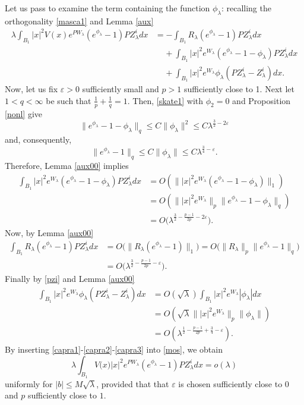 \documentclass[reqno,11pt]{amsart}
\theoremstyle{definition}
\numberwithin{equation}{section}
\newcommand{\la}{\lambda}
\newcommand{\into}{\int_{B_1}}
\newcommand{\e}{\varepsilon}
\renewcommand{\(}{\left(}
\renewcommand{\)}{\right)}
\renewcommand{\[}{\left[}
\renewcommand{\]}{\right]}
\newcommand{\beq}{\begin{equation}}
\newcommand{\eeq}{\end{equation}}
\begin{document}
{Let us pass to examine  the term containing the function $\phi_\la$: recalling the orthogonality \eqref{masca1} and Lemma \ref{aux}
\beq\label{mos}\begin{aligned} \la\int_{B_1}|x|^2 V(x) e^{P W_\la}(e^{\phi_\la}-1)PZ^i_{\la} dx&= -\into R_\la
(e^{\phi_\la}-1)PZ^i_{\la} dx
\\ &\;\;\;\;+ \int_{B_1}  |x|^2e^{W_\la}(e^{\phi_\la}-1-\phi_\la)PZ^i_{\la}  dx\\ &\;\;\;\;+ \into  |x|^2e^{W_\la}\phi_\la(PZ^i_{\la}-Z_\la^i)  dx.
\end{aligned}\eeq
Now, let us fix $\e>0$ sufficiently small and $p>1$ sufficiently close to 1.  
Next let  $1<q<\infty$ be such that  $\frac1p+\frac1q=1$. Then, 
\eqref{skate1} with $\phi_2=0$ and Proposition \ref{nonl} give
$$\|e^{\phi_\la}-1-\phi_\la\|_q\leq  C\|\phi_\la\|^2\leq C \la^{\frac32-2 \e} 
$$
and, consequently, 
\beq\label{tmtsur}\|e^{\phi_\la}-1\|_q\leq C\|\phi_\la\|\leq C\la^{\frac34-\e}
.\eeq
Therefore,  Lemma \ref{aux00}  implies
 \beq\label{capra1}\begin{aligned} 
 \int_{B_1} |x|^2e^{W_\la}(e^{\phi_\la}-1-\phi_\la)PZ^i_{\la} dx&
= O(\|  |x|^2e^{ W_\la}(e^{\phi_\la}-1-\phi_\la)\|_1)\\ &=
O(\|   |x|^2e^{W_\la} \|_p\|e^{\phi_\la}-1-\phi_\la\|_q)\\ &=O\Big(\la^{\frac32-\frac{p-1}{2p}-2\e} \Big).
\end{aligned}\eeq
Now, by Lemma \ref{aux00}
 \beq\label{capra2}\begin{aligned}  \into R_\la (e^{\phi_\la}-1) 
 PZ^i_{\la} dx&=
O\big(\big\|  
R_\la (e^{\phi_\la}-1)\big\|_1\big)
=O\big(\big\| 
R_\la\|_p\|e^{\phi_\la}-1\|_q\big)\\ &= O\Big(\la^{\frac32-\frac{p-1}{2p}-\e}\Big).\end{aligned}\eeq
Finally by \eqref{pzi}   and  Lemma \ref{aux00}
 \beq\label{capra3}\begin{aligned}  \into  |x|^2e^{W_\la}\phi_\la(PZ^i_{\la}-Z_\la^i)  dx&=O(\sqrt\la) \int_{B_1} |x|^2e^{W_\la}|\phi_\la|  dx
 \\ &=O(\sqrt\la\||x|^2e^{W_\la}\|_p\|\phi_\la\|)
 \\ &=O(\la^{\frac12-\frac{p-1}{2p}+\frac34-\e}). \end{aligned}\eeq
 By inserting \eqref{capra1}-\eqref{capra2}-\eqref{capra3} into \eqref{mos}, 
 we obtain
 \beq\label{capra}\la \int_{B_1} V\big(x\big) |x|^2e^{P W_\la}(e^{\phi_\la}-1)PZ^i_{\la} dx= o(\la) \eeq  uniformly for $|b|\leq M\sqrt\la$, provided that that $\e$ is chosen sufficiently close to $0$ and $p$ sufficiently close to $1$.



}
\end{document}
